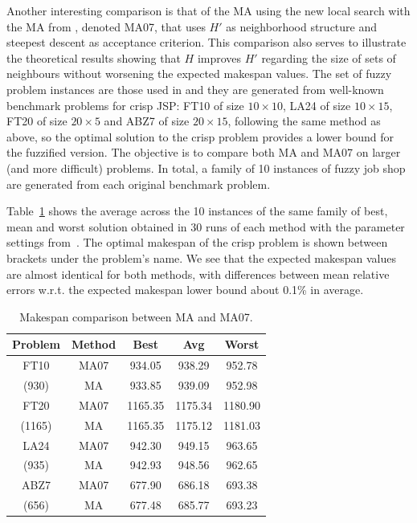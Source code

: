 \documentclass[letterpaper]{article}
\begin{document}
Another interesting comparison is that of the MA using the new local search with the MA from \cite{GonzalezRodriguez2007b}, denoted MA07, that uses $H'$ as neighborhood structure and steepest descent as acceptance criterion. This comparison also serves to illustrate the theoretical results showing that $H$ improves $H'$ regarding the size of sets of neighbours without worsening the expected makespan values. %
The set of fuzzy problem instances are those used in \cite{GonzalezRodriguez2007b} and they are generated from well-known benchmark problems for crisp JSP: FT10 of size $10\times10$, LA24 of size $10 \times 15$, FT20 of size $20\times 5$ and ABZ7 of size $20\times 15$, following the same method as above, so the optimal solution to the crisp problem provides a lower bound for the fuzzified version. The objective is to compare both MA and MA07 on larger (and more difficult) problems. In total, a family of 10 instances of fuzzy job shop are generated from each original benchmark problem.

Table~\ref{tabMAresults} shows the average across the 10 instances of the same family of best, mean and worst solution obtained in 30 runs of each method with the parameter settings from~\cite{GonzalezRodriguez2007b}. The optimal makespan of the crisp problem is shown between brackets under the problem's name. We see that the expected makespan values are almost identical for both methods, with differences between mean relative errors w.r.t. the expected makespan lower bound about 0.1\% in average.
\begin{table}[ht]
\caption{\label{tabMAresults} Makespan comparison between MA and MA07.}
\begin{center}
\begin{tabular}{c|c|ccc}
\hline\hline
Problem & Method & Best & Avg & Worst \\
\hline\hline
FT10& MA07 & 934.05 & 938.29 & 952.78\\
(930) & MA & 933.85 & 939.09 & 952.98\\
\hline
FT20 & MA07 & 1165.35 & 1175.34 & 1180.90\\
(1165) & MA & 1165.35 & 1175.12 & 1181.03\\
\hline
LA24 & MA07 & 942.30 & 949.15 & 963.65\\
(935) & MA & 942.93 & 948.56 & 962.65\\
\hline
ABZ7 & MA07 & 677.90 & 686.18 & 693.38\\
(656) & MA & 677.48 & 685.77 & 693.23\\
\hline\hline
\end{tabular}
\end{center}
\end{table}
\end{document}
